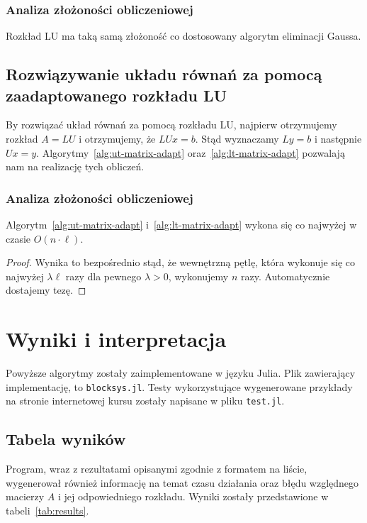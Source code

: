 \documentclass[../main.tex]{subfiles}
\begin{document}
  \subsection{Analiza złożoności obliczeniowej}
  Rozkład LU ma taką samą złożoność co dostosowany algorytm eliminacji Gaussa.

  \section{Rozwiązywanie układu równań za pomocą zaadaptowanego rozkładu LU}
  By rozwiązać układ równań za pomocą rozkładu LU, najpierw
  otrzymujemy rozkład \( A = LU \) i otrzymujemy,
  że \( LUx = b \). Stąd wyznaczamy \( Ly = b \) 
  i następnie \( Ux = y \). Algorytmy~\ref{alg:ut-matrix-adapt}
  oraz~\ref{alg:lt-matrix-adapt} pozwalają nam na realizację
  tych obliczeń.

  \subsection{Analiza złożoności obliczeniowej}

  \begin{fact} %
    Algorytm~\ref{alg:ut-matrix-adapt} i~\ref{alg:lt-matrix-adapt} wykona się
    co najwyżej w czasie \( O(n \cdot \ell) \).
  \end{fact}
  \begin{proof}
    Wynika to bezpośrednio stąd, że wewnętrzną pętlę, która wykonuje się
    co najwyżej \( \lambda \ell \) razy dla pewnego \( \lambda > 0 \), wykonujemy
    \( n \) razy. Automatycznie dostajemy tezę.
  \end{proof}

  \chapter{Wyniki i interpretacja}

  Powyższe algorytmy zostały zaimplementowane w języku Julia. Plik zawierający implementację,
  to \verb|blocksys.jl|. Testy wykorzystujące wygenerowane przykłady na stronie internetowej
  kursu zostały napisane w pliku \verb|test.jl|.

  \section{Tabela wyników}

  Program, wraz z rezultatami opisanymi zgodnie z formatem na liście, wygenerował
  również informację na temat czasu działania oraz błędu względnego macierzy
  \( A \) i jej odpowiedniego rozkładu. Wyniki zostały przedstawione w tabeli~\ref{tab:results}.
\end{document}

